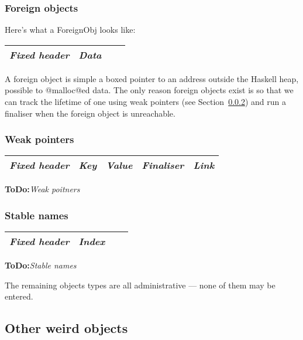 \documentclass[11pt]{article}
\newcommand{\ToDo}[1]{{{\bf ToDo:}\sl #1}}
\newcommand{\secref}[1]{Section~\ref{sec:#1}}
\newcommand{\Subsubsection}[2]{\subsubsection{#1}\label{sec:#2}}
\begin{document}
\Subsubsection{Foreign objects}{FOREIGN}

Here's what a ForeignObj looks like:

\begin{center}
\begin{tabular}{|l|l|l|l|}
\hline 
\emph{Fixed header} & \emph{Data} \\
\hline
\end{tabular}
\end{center}

A foreign object is simple a boxed pointer to an address outside the
Haskell heap, possible to @malloc@ed data.  The only reason foreign
objects exist is so that we can track the lifetime of one using weak
pointers (see \secref{WEAK}) and run a finaliser when the foreign
object is unreachable.

\subsubsection{Weak pointers}
\label{sec:WEAK}

\begin{center}
\begin{tabular}{|l|l|l|l|l|}
\hline 
\emph{Fixed header} & \emph{Key} & \emph{Value} & \emph{Finaliser}
& \emph{Link}\\
\hline
\end{tabular}
\end{center}

\ToDo{Weak poitners}

\subsubsection{Stable names}
\label{sec:STABLE_NAME}

\begin{center}
\begin{tabular}{|l|l|l|l|}
\hline 
\emph{Fixed header} & \emph{Index} \\
\hline
\end{tabular}
\end{center}

\ToDo{Stable names}

The remaining objects types are all administrative --- none of them
may be entered.

\subsection{Other weird objects}
\label{sec:SPARK}
\label{sec:BLOCKED_FETCH}
\end{document}
